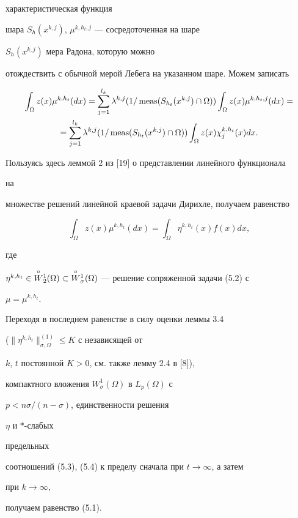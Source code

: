 \begin{pf}
характеристическая функция 


шара $S_h(x^{k,j})$, $\mu^{k,h_t,j}$ --- сосредоточенная на шаре 


$S_h(x^{k,j})$ мера Радона, которую можно 


отождествить с обычной мерой Лебега на указанном шаре. Можем записать 


\begin{multline*} 


\int_\Omega z(x)\mu^{k,h_t}(dx)=\sum^{l_k}_{j=1} \lambda^{k,j} 


(1/\meas(S_{h_t}(x^{k,j})\cap\Omega))\int_\Omega 


z(x)\mu^{k,h_t,j}(dx)= \\ 


% 


=\sum^{l_k}_{j=1} \lambda^{k,j}(1/\meas(S_{h_t}(x^{k,j}) 


\cap\Omega))\int_\Omega z(x)\chi^{k,h_t}_j(x)dx. 


\end{multline*} 


Пользуясь здесь леммой 2 из [19] о представлении линейного функционала 


на 


множестве решений линейной краевой задачи Дирихле, получаем равенство 


$$ 


\int_\Omega z(x)\mu^{k,h_t}(dx)= 


\int_\Omega \eta^{k,h_t}(x)f(x)dx, 


$$ 


где 


$\eta^{k,h_t}\in\up{\circ}{W}^1_2(\Omega)\subset 


\up{\circ}{W}^1_\sigma(\Omega)$ --- решение сопряженной задачи (5.2) с 


$\mu=\mu^{k,h_t}$. 


Переходя в последнем равенстве в силу оценки леммы 3.4


($\|\eta^{k,h_t}\|^{(1)}_{\sigma,\Omega}\le K$ с независящей от


$k$, $t$ постоянной $K>0$, см. также лемму 2.4 в [8]),


компактного вложения $W^1_\sigma(\Omega)$ в $L_p(\Omega)$ с


$p<n\sigma/(n-\sigma)$, единственности решения


$\eta$ и $*$-слабых


предельных 


соотношений (5.3), (5.4) к пределу сначала при $t\to\infty$, а затем 


при $k\to\infty$, 


получаем равенство (5.1). 


\end{pf} 


